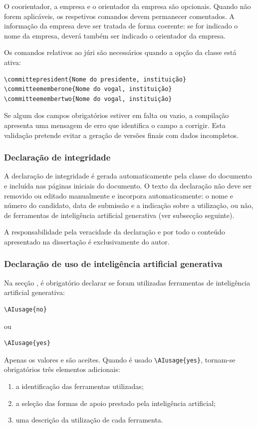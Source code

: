 O coorientador, a empresa e o orientador da empresa são opcionais. Quando não forem aplicáveis, os respetivos comandos devem permanecer comentados. A informação da empresa deve ser tratada de forma coerente: se for indicado o nome da empresa, deverá também ser indicado o orientador da empresa.

Os comandos relativos ao júri são necessários quando a opção  da classe está ativa:
\begin{verbatim}
\committepresident{Nome do presidente, instituição}
\committeememberone{Nome do vogal, instituição}
\committeemembertwo{Nome do vogal, instituição}
\end{verbatim}

Se algum dos campos obrigatórios estiver em falta ou vazio, a compilação apresenta uma mensagem de erro que identifica o campo a corrigir. Esta validação pretende evitar a geração de versões finais com dados incompletos.

\subsubsection*{Declaração de integridade}

A declaração de integridade é gerada automaticamente pela classe do documento e incluída nas páginas iniciais do documento. O texto da declaração não deve ser removido ou editado manualmente e incorpora automaticamente: o nome e número do candidato, data de submissão e a indicação sobre a utilização, ou não, de ferramentas de inteligência artificial generativa (ver subsecção seguinte).

A responsabilidade pela veracidade da declaração e por todo o conteúdo apresentado na dissertação é exclusivamente do autor.

\subsubsection*{Declaração de uso de inteligência artificial generativa}
\label{subsec:ai-template}

Na secção , é obrigatório declarar se foram utilizadas ferramentas de inteligência artificial generativa:
\begin{verbatim}
\AIusage{no}
\end{verbatim}
ou
\begin{verbatim}
\AIusage{yes}
\end{verbatim}

Apenas os valores  e  são aceites. Quando é usado \verb|\AIusage{yes}|, tornam-se obrigatórios três elementos adicionais:
\begin{enumerate}
    \item a identificação das ferramentas utilizadas;
    \item a seleção das formas de apoio prestado pela inteligência artificial;
    \item uma descrição da utilização de cada ferramenta.
\end{enumerate}

